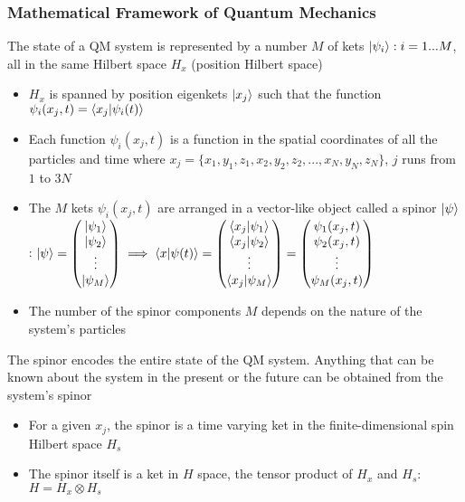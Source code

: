 \documentclass[8pt,t,mathserif,aspectratio=169]{beamer}
\begin{document}
\begin{frame}
  \frametitle{Mathematical Framework of Quantum Mechanics}
  \vspace{1mm}
  The state of a QM system is represented by a number $M$ of kets $\ket{\psi_i} : i = 1 ... M$, all in the same Hilbert space $H_x$ (position Hilbert space)
  \begin{itemize}
    \item $H_x$ is spanned by position eigenkets $\ket{x_j}$ such that the function $\psi_i(x_j,t) = \braket{x_j}{\psi_i(t)}$
    \item Each function $\psi_i(x_j,t)$ is a function in the spatial coordinates of all the particles and time where $x_j = \{x_1,y_1,z_1,x_2,y_2,z_2,...,x_N,y_N,z_N\}$, $j$ runs from $1$ to $3N$
    \item The $M$ kets $\psi_i(x_j,t)$ are arranged in a vector-like object called a spinor $\ket{\psi}$ : $\ket{\psi} = \begin{pmatrix} \ket{\psi_1} \\ \ket{\psi_2} \\ \vdots \\ \ket{\psi_M} \end{pmatrix} \implies \braket{x}{\psi(t)} = \begin{pmatrix} \braket{x_j}{\psi_1} \\ \braket{x_j}{\psi_2} \\ \vdots \\ \braket{x_j}{\psi_M} \end{pmatrix} = \begin{pmatrix} \psi_1(x_j,t) \\ \psi_2(x_j,t) \\ \vdots \\ \psi_M(x_j,t) \end{pmatrix}$
    \item The number of the spinor components $M$ depends on the nature of the system's particles
  \end{itemize}
  The spinor encodes the entire state of the QM system. Anything that can be known about the system in the present or the future can be obtained from the system's spinor
  \begin{itemize}
    \item For a given $x_j$, the spinor is a time varying ket in the finite-dimensional spin Hilbert space $H_s$
    \item The spinor itself is a ket in $H$ space, the tensor product of $H_x$ and $H_s$: $H = H_x \otimes H_s$
  \end{itemize}
\end{frame}
\end{document}
